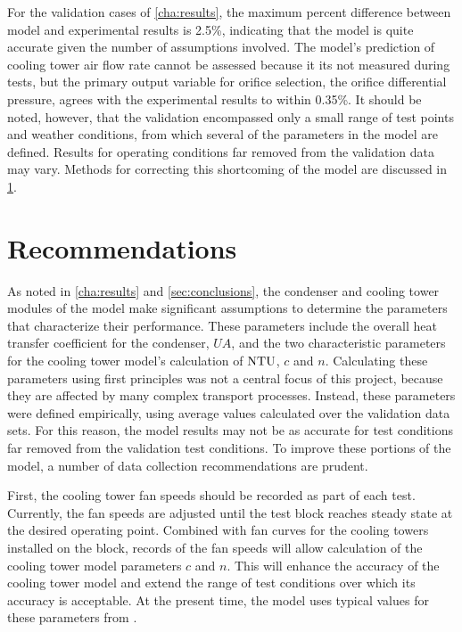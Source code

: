 For the validation cases of \cref{cha:results}, the maximum percent difference between model
and experimental results is 2.5\%, indicating that the model is quite accurate given the number of assumptions involved.
The model's prediction of cooling tower air flow rate cannot be assessed because
it its not measured during tests, but the primary output variable for 
orifice selection, the orifice differential pressure,
agrees with the experimental results to within 0.35\%.
It should be noted, however, that the validation encompassed only a
small range of test points and weather conditions, from which several
of the parameters in the model are defined.
Results for operating conditions far removed from the validation data
may vary.
Methods for correcting this shortcoming of the model are discussed in \cref{sec:recommend}.

\section{Recommendations} \label{sec:recommend}
As noted in \cref{cha:results} and \cref{sec:conclusions},
the condenser and cooling tower modules of the model make significant
assumptions to determine the parameters that characterize their performance.
These parameters include the overall heat transfer coefficient for the condenser, $UA$,
and the two characteristic parameters for the cooling tower model's 
calculation of $\mathrm{NTU}$, $c$ and $n$.
Calculating these parameters using first principles was not a central focus of this project, 
because they are affected by many complex transport processes.
Instead, these parameters were defined empirically, using average values calculated over the 
validation data sets.
For this reason, the model results may not be as accurate for test conditions
far removed from the validation test conditions.
To improve these portions of the model, a number of data collection
recommendations are prudent.

First, the cooling tower fan speeds should be recorded as part of each test.
Currently, the fan speeds are adjusted until the test block reaches steady state
at the desired operating point.
Combined with fan curves for the cooling towers installed on the block,
records of the fan speeds will allow calculation of the cooling tower
model parameters $c$ and $n$. 
This will enhance the accuracy of the cooling tower model and extend the range
of test conditions over which its accuracy is acceptable.
At the present time, the model uses typical values for these parameters from \textcite{braun1989}.

